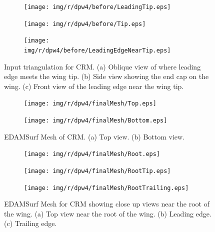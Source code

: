\begin{figure}[!hbt]
	\centering
	\begin{subfigure}{\textwidth}
		\centering
		\texttt{[image: img/r/dpw4/before/LeadingTip.eps]}
		\caption{}
		\label{dBeforeLeadingTip}
	\end{subfigure}
	\begin{subfigure}{\textwidth}
		\centering
		\texttt{[image: img/r/dpw4/before/Tip.eps]}
		\caption{}
		\label{dBeforeTip}
	\end{subfigure}
	\begin{subfigure}{\textwidth}
		\centering
		\texttt{[image: img/r/dpw4/before/LeadingEdgeNearTip.eps]}
		\caption{}
		\label{dBeforeLeading}
	\end{subfigure}
	\caption[Close up views of CRM's input triangulation.]{Input triangulation for CRM. (a) Oblique view of where leading edge meets the wing tip. (b) Side view showing the end cap on the wing. (c) Front view of the leading edge near the wing tip.}
	\label{fig-beforeTip}
\end{figure}

\begin{figure}[!hbt]
	\centering
	\begin{subfigure}{\textwidth}
		\centering
		\texttt{[image: img/r/dpw4/finalMesh/Top.eps]}
		\caption{}
		\label{dTop}
	\end{subfigure}
	\begin{subfigure}{\textwidth}
		\centering
		\texttt{[image: img/r/dpw4/finalMesh/Bottom.eps]}
		\caption{}
		\label{dBottom}
	\end{subfigure}
	\caption[Top and bottom view of EDAMSurf Mesh of CRM.]{EDAMSurf Mesh of CRM. (a) Top view. (b) Bottom view.}
	\label{fig-dpw4TopAndBottom}
\end{figure}

\begin{figure}
	\centering
	\begin{subfigure}{\textwidth}
		\centering
		\texttt{[image: img/r/dpw4/finalMesh/Root.eps]}
		\caption{}
		\label{dRoot}
	\end{subfigure}
	\begin{subfigure}{\textwidth}
		\centering
		\texttt{[image: img/r/dpw4/finalMesh/RootTip.eps]}
		\caption{}
		\label{dLeadingRoot}
	\end{subfigure}	
	\begin{subfigure}{\textwidth}
		\centering
		\texttt{[image: img/r/dpw4/finalMesh/RootTrailing.eps]}
		\caption{}
		\label{dRootTrailing}
	\end{subfigure}
	\caption[Close up views near wing root of EDAMSurf mesh of CRM.]{EDAMSurf Mesh for CRM showing close up views near the root of the wing. (a) Top view near the root of the wing. (b) Leading edge. (c) Trailing edge.}
	\label{fig-dpw4Root}
\end{figure}

